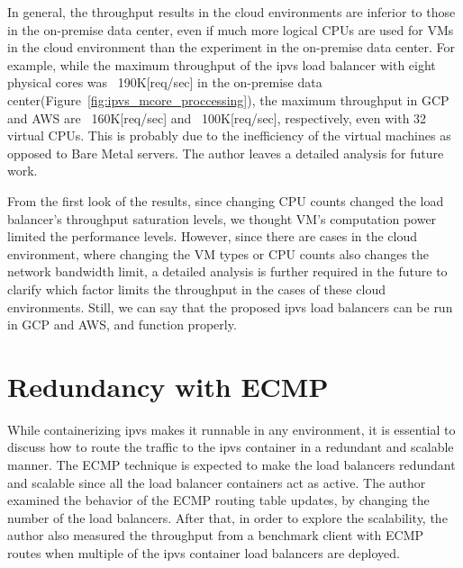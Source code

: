 In general, the throughput results in the cloud environments are inferior to those in the on-premise data center, even if much more logical CPUs are used for VMs in the cloud environment than the experiment in the on-premise data center.
For example, while the maximum throughput of the ipvs load balancer with eight physical cores was ~190K[req/sec] in the on-premise data center(Figure~\ref{fig:ipvs_mcore_proccessing}), the maximum throughput in GCP and AWS are ~160K[req/sec] and ~100K[req/sec], respectively, even with 32 virtual CPUs.
This is probably due to the inefficiency of the virtual machines as opposed to Bare Metal servers.
The author leaves a detailed analysis for future work.

From the first look of the results, since changing CPU counts changed the load balancer's throughput saturation levels, we thought VM's computation power limited the performance levels.
However, since there are cases in the cloud environment, where changing the VM types or CPU counts also changes the network bandwidth limit, a detailed analysis is further required in the future to clarify which factor limits the throughput in the cases of these cloud environments.
Still, we can say that the proposed ipvs load balancers can be run in GCP and AWS, and function properly.


\FloatBarrier

\section{Redundancy with ECMP}

While containerizing ipvs makes it runnable in any environment, it is essential to discuss how to route the traffic to the ipvs container in a redundant and scalable manner.
The ECMP technique is expected to make the load balancers redundant and scalable since all the load balancer containers act as active.
The author examined the behavior of the ECMP routing table updates, by changing the number of the load balancers.
After that, in order to explore the scalability, the author also measured the throughput from a benchmark client with ECMP routes when multiple of the ipvs container load balancers are deployed.

